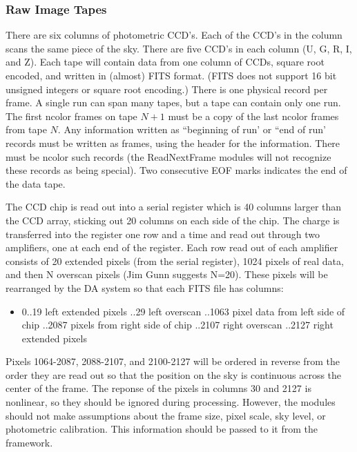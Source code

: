 \subsubsection{Raw Image Tapes}

	There are six columns of photometric CCD's.  Each of the CCD's
in the column scans the same piece of the sky.  There are five CCD's in
each column (U, G, R, I, and Z).  Each tape will contain data from one 
column of CCDs, square root encoded, and written in (almost)
FITS format.  (FITS does not support 16 bit unsigned integers or square
root encoding.)  There is one physical record per frame.
A single run can span many tapes, but a tape can contain only one run.
The first ncolor frames on tape $N+1$ must be a copy of the last
ncolor frames from tape $N$.
Any information written as ``beginning of run' or ``end of run' records
must be written as frames, using the header for the information.  There
must be ncolor such records (the ReadNextFrame modules will not recognize
these records as being special).  Two consecutive EOF marks indicates
the end of the data tape.

	The CCD chip is read out into a serial register which is 40 columns
larger than the CCD array, sticking out 20 columns on each side of the chip.
The charge is transferred into the register one row and a time and read
out through two amplifiers, one at each end of the register.  Each row
read out of each amplifier consists of 20 extended pixels (from the serial
register), 1024 pixels of real data, and then N overscan pixels (Jim
Gunn suggests N=20).  These pixels will be rearranged by the DA system
so that each FITS file has columns:
\begin{itemize}
\item 0..19 left extended pixels
..29 left overscan
..1063 pixel data from left side of chip
..2087 pixels from right side of chip
..2107 right overscan
..2127 right extended pixels
\end{itemize}
Pixels 1064-2087, 2088-2107, and 2100-2127 will be ordered in reverse from 
the order they are read out so that the
position on the sky is continuous across the center of the frame.  The
reponse of the pixels in columns 30 and 2127 is nonlinear, so they should
be ignored during processing.  However, the modules should not make assumptions
about the frame size, pixel scale, sky level, or photometric calibration.  This
information should be passed to it from the framework.

